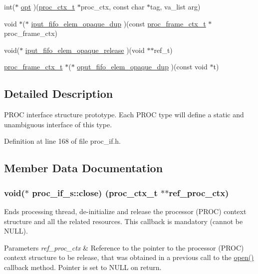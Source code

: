\begin{DoxyCompactItemize}
int($\ast$ \hyperlink{structproc__if__s_a4ca0939d6721f368d2560851197fca36}{opt} )(\hyperlink{proc_8h_ae264f89be30fc03f5053bc16d58cba05}{proc\+\_\+ctx\+\_\+t} $\ast$proc\+\_\+ctx, const char $\ast$tag, va\+\_\+list arg)
\item 
void $\ast$($\ast$ \hyperlink{structproc__if__s_a558cec57df436699d4154775894f2313}{iput\+\_\+fifo\+\_\+elem\+\_\+opaque\+\_\+dup} )(const \hyperlink{structproc__frame__ctx__s}{proc\+\_\+frame\+\_\+ctx\+\_\+t} $\ast$proc\+\_\+frame\+\_\+ctx)
\item 
void($\ast$ \hyperlink{structproc__if__s_aec3bf948ff945ac2f5a4c834ea3b57da}{iput\+\_\+fifo\+\_\+elem\+\_\+opaque\+\_\+release} )(void $\ast$$\ast$ref\+\_\+t)
\item 
\hyperlink{structproc__frame__ctx__s}{proc\+\_\+frame\+\_\+ctx\+\_\+t} $\ast$($\ast$ \hyperlink{structproc__if__s_a7806bbda25988d9ee54f6d0bb143c697}{oput\+\_\+fifo\+\_\+elem\+\_\+opaque\+\_\+dup} )(const void $\ast$t)
\end{DoxyCompactItemize}


\subsection{Detailed Description}
P\+R\+OC interface structure prototype. Each P\+R\+OC type will define a static and unambiguous interface of this type. 

Definition at line 168 of file proc\+\_\+if.\+h.



\subsection{Member Data Documentation}
\subsubsection[{\texorpdfstring{close}{close}}]{\setlength{\rightskip}{0pt plus 5cm}void($\ast$ proc\+\_\+if\+\_\+s\+::close) ({\bf proc\+\_\+ctx\+\_\+t} $\ast$$\ast$ref\+\_\+proc\+\_\+ctx)}\hypertarget{structproc__if__s_af5971ac1d09d1c6ec3508c36fb286c19}{}\label{structproc__if__s_af5971ac1d09d1c6ec3508c36fb286c19}
Ends processing thread, de-\/initialize and release the processor (P\+R\+OC) context structure and all the related resources. This callback is mandatory (cannot be N\+U\+LL). 
\begin{DoxyParams}{Parameters}
{\em ref\+\_\+proc\+\_\+ctx} & Reference to the pointer to the processor (P\+R\+OC) context structure to be release, that was obtained in a previous call to the \textquotesingle{}\hyperlink{structproc__if__s_a34999576771394dfb721463c8455ba06}{open()}\textquotesingle{} callback method. Pointer is set to N\+U\+LL on return. \\
\hline
\end{DoxyParams}


